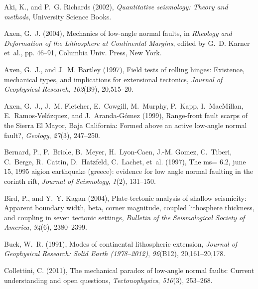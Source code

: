 \documentclass[draft,grl]{AGUTeX}
\begin{document}
\begin{article}
\begin{thebibliography}{32}
Aki, K., and P.~G. Richards (2002), \textit{Quantitative seismology: Theory and
  methods}, University Science Books.

Axen, G.~J. (2004), Mechanics of low-angle normal faults, in \textit{Rheology
  and Deformation of the Lithosphere at Continental Margins}, edited by G.~D.
  Karner et~al., pp. 46--91, Columbia Univ. Press, New York.

Axen, G.~J., and J.~M. Bartley (1997), Field tests of rolling hinges:
  Existence, mechanical types, and implications for extensional tectonics,
  \textit{Journal of Geophysical Research}, \textit{102}(B9), 20,515--20.

Axen, G.~J., J.~M. Fletcher, E.~Cowgill, M.~Murphy, P.~Kapp, I.~MacMillan,
  E.~Ramos-Vel{\'a}zquez, and J.~Aranda-G{\'o}mez (1999), Range-front fault
  scarps of the {Sierra El Mayor}, {Baja California}: {F}ormed above an active
  low-angle normal fault?, \textit{Geology}, \textit{27}(3), 247--250.

Bernard, P., P.~Briole, B.~Meyer, H.~Lyon-Caen, J.-M. Gomez, C.~Tiberi,
  C.~Berge, R.~Cattin, D.~Hatzfeld, C.~Lachet, et~al. (1997), The ms= 6.2, june
  15, 1995 aigion earthquake (greece): evidence for low angle normal faulting
  in the corinth rift, \textit{Journal of Seismology}, \textit{1}(2), 131--150.

Bird, P., and Y.~Y. Kagan (2004), Plate-tectonic analysis of shallow
  seismicity: Apparent boundary width, beta, corner magnitude, coupled
  lithosphere thickness, and coupling in seven tectonic settings,
  \textit{Bulletin of the Seismological Society of America}, \textit{94}(6),
  2380--2399.

Buck, W.~R. (1991), Modes of continental lithospheric extension,
  \textit{Journal of Geophysical Research: Solid Earth (1978--2012)},
  \textit{96}(B12), 20,161--20,178.

Collettini, C. (2011), The mechanical paradox of low-angle normal faults:
  Current understanding and open questions, \textit{Tectonophysics},
  \textit{510}(3), 253--268.


\end{thebibliography}
\end{article}
\end{document}
